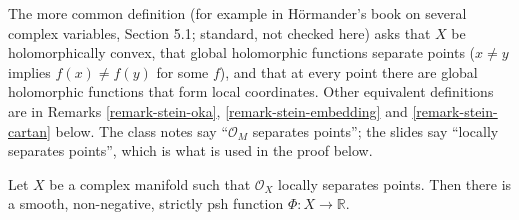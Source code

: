 \begin{remark}
\label{remark-stein-other-definitions}
The more common definition (for example in
H\"ormander's book on several complex
variables, Section 5.1; standard, not checked
here) asks that $X$ be holomorphically
convex, that global holomorphic functions
separate points ($x\neq y$ implies $f(x)\neq
f(y)$ for some $f$), and that at every point
there are global holomorphic functions that
form local coordinates. Other equivalent
definitions are in Remarks
\ref{remark-stein-oka},
\ref{remark-stein-embedding} and
\ref{remark-stein-cartan} below. The class
notes say ``$\mathcal{O}_M$ separates
points''; the slides say ``locally separates
points'', which is what is used in the proof
below.
\end{remark}

\begin{theorem}
\label{theorem-separates-points-spsh}
Let $X$ be a complex manifold such that
$\mathcal{O}_X$ locally separates points.
Then there is a smooth, non-negative,
strictly psh function $\Phi\colon
X\to\mathbb{R}$.
\end{theorem}

